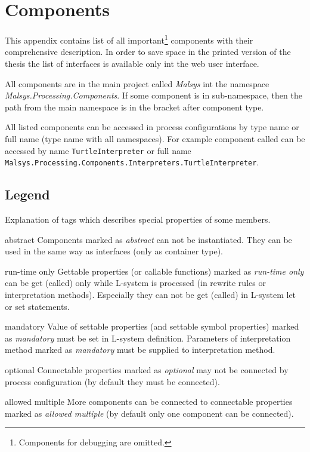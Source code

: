
\chapter{Components}
\label{chap:components}

This appendix contains list of all important\footnote{Components for debugging are omitted.} components with their comprehensive description.
In order to save space in the printed version of the thesis the list of interfaces is available only int the web user interface.

All components are in the main project called \emph{Malsys} int the namespace \emph{Malsys.Processing.Components}.
If some component is in sub-namespace, then the path from the main namespace is in the bracket after component type.

All listed components can be accessed in process configurations by type name or full name (type name with all namespaces).
For example component called  can be accessed by name \texttt{TurtleInterpreter} or full name \texttt{Malsys.Processing.Components.Interpreters.TurtleInterpreter}.

\section{Legend}

Explanation of tags which describes special properties of some members.

\begin{description*}
	\item[abstract]
		Components marked as \emph{abstract} can not be instantiated.
		They can be used in the same way as interfaces (only as container type).
	\item[run-time only]
		Gettable properties (or callable functions) marked as \emph{run-time only} can be get (called) only while L-system is processed (in rewrite rules or interpretation methods).
		Especially they can not be get (called) in L-system let or set statements.
	\item[mandatory]
		Value of settable properties (and settable symbol properties) marked as \emph{mandatory} must be set in L-system definition.
		Parameters of interpretation method marked as \emph{mandatory} must be supplied to interpretation method.
	\item[optional]
		Connectable properties marked as \emph{optional} may not be connected by process configuration (by default they must be connected).
	\item[allowed multiple]
		More components can be connected to connectable properties marked as \emph{allowed multiple} (by default only one component can be connected).
		
\end{description*}




